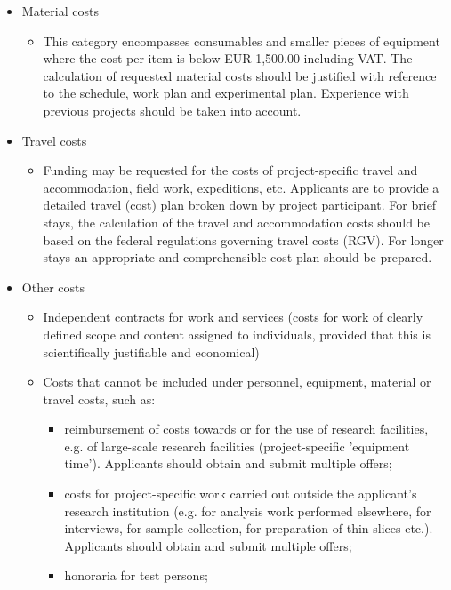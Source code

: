 \documentclass[a4paper,11pt]{article}
\begin{document}
{\begin{itemize}
\begin{itemize}
	\end{itemize}
\item Material costs
	\begin{itemize}
	\item     This category encompasses consumables and smaller pieces of equipment where the cost per item is below EUR 1,500.00 including VAT. The calculation of requested material costs should be justified with reference to the schedule, work plan and experimental plan. Experience with previous projects should be taken into account.
	\end{itemize}
\item Travel costs
	\begin{itemize}
	\item Funding may be requested for the costs of project-specific travel and accommodation, field work, expeditions, etc. Applicants are to provide a detailed travel (cost) plan broken down by project participant. For brief stays, the calculation of the travel and accommodation costs should be based on the federal regulations governing travel costs (RGV). For longer stays an appropriate and comprehensible cost plan should be prepared.
	\end{itemize}
\item Other costs
	\begin{itemize}
	\item     Independent contracts for work and services (costs for work of clearly defined scope and content assigned to individuals, provided that this is scientifically justifiable and economical)
    	\item     Costs that cannot be included under personnel, equipment, material or travel costs, such as:
		\begin{itemize}
		\item         reimbursement of costs towards or for the use of research facilities, e.g. of large-scale research facilities (project-specific 'equipment time'). Applicants should obtain and submit multiple offers;
		\item         costs for project-specific work carried out outside the applicant's research institution (e.g. for analysis work performed elsewhere, for interviews, for sample collection, for preparation of thin slices etc.). Applicants should obtain and submit multiple offers;
		\item         honoraria for test persons;
		\end{itemize}
	\end{itemize}
\end{itemize}
}
\end{document}
